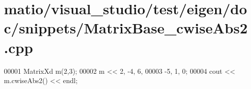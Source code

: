 \hypertarget{matio_2visual__studio_2test_2eigen_2doc_2snippets_2_matrix_base__cwise_abs2_8cpp_source}{}\section{matio/visual\+\_\+studio/test/eigen/doc/snippets/\+Matrix\+Base\+\_\+cwise\+Abs2.cpp}
\label{matio_2visual__studio_2test_2eigen_2doc_2snippets_2_matrix_base__cwise_abs2_8cpp_source}

\begin{DoxyCode}
00001 MatrixXd m(2,3);
00002 m << 2, -4, 6,   
00003      -5, 1, 0;
00004 cout << m.cwiseAbs2() << endl;
\end{DoxyCode}
